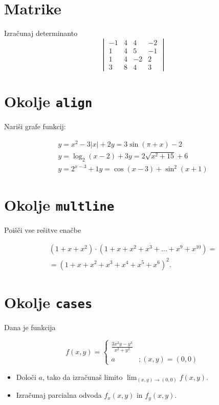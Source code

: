 \documentclass[a4paper,12pt]{article}
\begin{document}
\section*{Matrike}
Izračunaj determinanto
\[
\begin{vmatrix}
       -1 & 4 & 4 & -2 \\
       1 & 4 & 5 & -1 \\
       1 & 4 & -2 & 2 \\
       3 & 8 & 4 & 3 
\end{vmatrix}
\]
\section*{Okolje \texttt{align}}
Nariši grafe funkcij:

\begin{align*}
   y = x^2 - 3|x| + 2    y = 3 \sin(\pi+x) - 2\\
   y = \log_2(x-2) + 3   y = 2 \sqrt{x^2+15} + 6\\
   y = 2^{x-3} + 1       y = \cos(x-3) + \sin^2(x+1)
\end{align*}


\section*{Okolje \texttt{multline}}
Poišči vse rešitve enačbe

\begin{multline*}
   (1+x+x^2) \cdot (1+x+x^2+x^3+\ldots+x^9+x^{10}) =\\
   =(1+x+x^2+x^3+x^4+x^5+x^6)^2.
\end{multline*}

\section*{Okolje \texttt{cases}}
Dana je funkcija
  
\begin{equation*}
   f(x,y) = \begin{cases}
      \frac{3x^2y-y^3}{x^2+y^2}\\
      a& ; (x,y)=(0,0)
   \end{cases}
\end{equation*}
\begin{itemize}
\item Določi \(a\), tako da izračunaš limito \( \lim_{(x,y)\to(0,0)} f(x,y) \).
\item Izračunaj parcialna odvoda \(f_x(x,y)\) in \(f_y(x,y)\).
\end{itemize}
\end{document}
